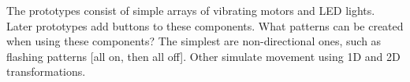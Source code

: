 \documentclass{chi-ext}
\begin{document}

The prototypes consist of simple arrays of vibrating motors and LED lights. Later prototypes add buttons to these components. What patterns can be created when using these components? The simplest are non-directional ones, such as flashing patterns [all on, then all off]. Other simulate movement using 1D and 2D transformations.


\end{document}
